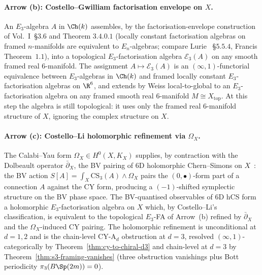 \paragraph{Arrow (b): Costello--Gwilliam factorisation envelope on $X$.}
An $E_3$-algebra $A$ in $\Ch(k)$ assembles, by the factorisation-envelope
construction of \cite{CostelloGwilliam} Vol.~I~\S$3.6$ and Theorem
$3.4.0.1$ (locally constant factorisation algebras on framed
$n$-manifolds are equivalent to $E_n$-algebras;
compare Lurie \cite{LurieHA}~\S$5.5.4$, Francis \cite{Francis2013}
Theorem~$1.1$), into
a topological $E_3$-factorisation algebra $\mathcal{E}_3(A)$ on any
smooth framed real $6$-manifold. The assignment
$A \mapsto \mathcal{E}_3(A)$ is an $(\infty, 1)$-functorial equivalence
between $E_3$-algebras in $\Ch(k)$ and framed locally constant
$E_3$-factorisation algebras on $\R^6$, and extends by Weiss
local-to-global to an $E_3$-factorisation algebra on any framed smooth
real $6$-manifold $M \cong X_{\mathrm{top}}$. At this step the algebra
is still topological: it uses only the framed real $6$-manifold
structure of $X$, ignoring the complex structure on $X$.

\paragraph{Arrow (c): Costello--Li holomorphic refinement via $\Omega_X$.}
The Calabi--Yau form $\Omega_X \in H^0(X, K_X)$ supplies, by contraction
with the Dolbeault operator $\bar\partial_X$, the BV pairing of 6D
holomorphic Chern--Simons on $X$~\cite{CostelloLi2016,CostelloLi2020}:
the BV action $S[A] = \int_X \mathrm{CS}_3(A) \wedge \Omega_X$ pairs
the $(0, \bullet)$-form part of a connection $A$ against the CY form,
producing a $(-1)$-shifted symplectic structure on the BV phase space.
The BV-quantised observables of 6D hCS form a holomorphic
$E_3$-factorisation algebra on $X$ which, by Costello--Li's
classification, is equivalent to the topological $E_3$-FA of Arrow~(b)
refined by $\bar\partial_X$ and the $\Omega_X$-induced CY pairing. The
holomorphic refinement is unconditional at $d = 1, 2$ and is the
chain-level CY-A$_d$ obstruction at $d = 3$, resolved
$(\infty, 1)$-categorically by Theorem~\ref{thm:cy-to-chiral-d3} and
chain-level at $d = 3$ by Theorem~\ref{thm:s3-framing-vanishes}
(three obstruction vanishings plus Bott periodicity
$\pi_3(B\Sp(2m)) = 0$).

